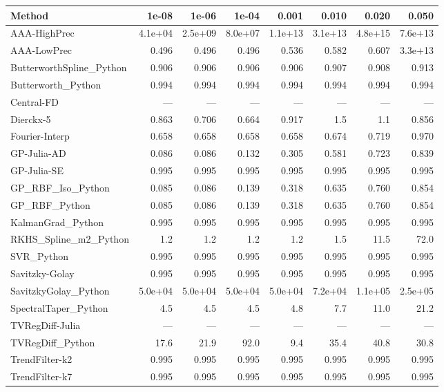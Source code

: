 \documentclass[10pt]{article}
\begin{document}
\begin{longtable}{lrrrrrrr}
\toprule
\textbf{Method} & \textbf{1e-08} & \textbf{1e-06} & \textbf{1e-04} & \textbf{0.001} & \textbf{0.010} & \textbf{0.020} & \textbf{0.050} \\
\midrule
\endhead
AAA-HighPrec & 4.1e+04 & 2.5e+09 & 8.0e+07 & 1.1e+13 & 3.1e+13 & 4.8e+15 & 7.6e+13 \\
AAA-LowPrec & 0.496 & 0.496 & 0.496 & 0.536 & 0.582 & 0.607 & 3.3e+13 \\
ButterworthSpline\_Python & 0.906 & 0.906 & 0.906 & 0.906 & 0.907 & 0.908 & 0.913 \\
Butterworth\_Python & 0.994 & 0.994 & 0.994 & 0.994 & 0.994 & 0.994 & 0.994 \\
Central-FD & --- & --- & --- & --- & --- & --- & --- \\
Dierckx-5 & 0.863 & 0.706 & 0.664 & 0.917 & 1.5 & 1.1 & 0.856 \\
Fourier-Interp & 0.658 & 0.658 & 0.658 & 0.658 & 0.674 & 0.719 & 0.970 \\
GP-Julia-AD & 0.086 & 0.086 & 0.132 & 0.305 & 0.581 & 0.723 & 0.839 \\
GP-Julia-SE & 0.995 & 0.995 & 0.995 & 0.995 & 0.995 & 0.995 & 0.995 \\
GP\_RBF\_Iso\_Python & 0.085 & 0.086 & 0.139 & 0.318 & 0.635 & 0.760 & 0.854 \\
GP\_RBF\_Python & 0.085 & 0.086 & 0.139 & 0.318 & 0.635 & 0.760 & 0.854 \\
KalmanGrad\_Python & 0.995 & 0.995 & 0.995 & 0.995 & 0.995 & 0.995 & 0.995 \\
RKHS\_Spline\_m2\_Python & 1.2 & 1.2 & 1.2 & 1.2 & 1.5 & 11.5 & 72.0 \\
SVR\_Python & 0.995 & 0.995 & 0.995 & 0.995 & 0.995 & 0.995 & 0.995 \\
Savitzky-Golay & 0.995 & 0.995 & 0.995 & 0.995 & 0.995 & 0.995 & 0.995 \\
SavitzkyGolay\_Python & 5.0e+04 & 5.0e+04 & 5.0e+04 & 5.0e+04 & 7.2e+04 & 1.1e+05 & 2.5e+05 \\
SpectralTaper\_Python & 4.5 & 4.5 & 4.5 & 4.8 & 7.7 & 11.0 & 21.2 \\
TVRegDiff-Julia & --- & --- & --- & --- & --- & --- & --- \\
TVRegDiff\_Python & 17.6 & 21.9 & 92.0 & 9.4 & 35.4 & 40.8 & 30.8 \\
TrendFilter-k2 & 0.995 & 0.995 & 0.995 & 0.995 & 0.995 & 0.995 & 0.995 \\
TrendFilter-k7 & 0.995 & 0.995 & 0.995 & 0.995 & 0.995 & 0.995 & 0.995 \\

\end{longtable}
\end{document}
